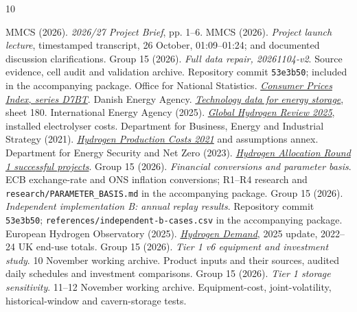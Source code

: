 \begin{thebibliography}{10}
\small\setlength{\itemsep}{3pt}\setlength{\parskip}{0pt}
 MMCS (2026). \emph{2026/27 Project Brief}, pp. 1--6.
 MMCS (2026). \emph{Project launch lecture}, timestamped
transcript, 26 October, 01:09--01:24; and documented discussion clarifications.
 Group 15 (2026). \emph{Full data repair, 20261104-v2}.
Source evidence, cell audit and validation archive. Repository commit
\texttt{53e3b50}; included in the accompanying package.
 Office for National Statistics.
\href{https://www.ons.gov.uk/economy/inflationandpriceindices/timeseries/d7bt/mm23}
{\emph{Consumer Prices Index, series D7BT}}.
 Danish Energy Agency.
\href{https://ens.dk/media/6589/download}{\emph{Technology data for energy storage}},
sheet 180.
 International Energy Agency (2025).
\href{https://www.iea.org/reports/global-hydrogen-review-2025/executive-summary}
{\emph{Global Hydrogen Review 2025}}, installed electrolyser costs.
 Department for Business, Energy and Industrial Strategy (2021).
\href{https://assets.publishing.service.gov.uk/media/611b710e8fa8f53dc994e59d/Hydrogen_Production_Costs_2021.pdf}
{\emph{Hydrogen Production Costs 2021}} and assumptions annex.
 Department for Energy Security and Net Zero (2023).
\href{https://www.gov.uk/government/publications/hydrogen-production-business-model-net-zero-hydrogen-fund-shortlisted-projects/hydrogen-production-business-model-net-zero-hydrogen-fund-har1-successful-projects}
{\emph{Hydrogen Allocation Round 1 successful projects}}.
 Group 15 (2026). \emph{Financial conversions and parameter basis}.
ECB exchange-rate and ONS inflation conversions; R1--R4 research and
\texttt{research/PARAMETER\_BASIS.md} in the accompanying package.
 Group 15 (2026). \emph{Independent implementation B: annual
replay results}. Repository commit \texttt{53e3b50};
\texttt{references/independent-b-cases.csv} in the accompanying package.
 European Hydrogen Observatory (2025).
\href{https://observatory.clean-hydrogen.europa.eu/hydrogen-landscape/end-use/hydrogen-demand}
{\emph{Hydrogen Demand}}, 2025 update, 2022--24 UK end-use totals.
 Group 15 (2026). \emph{Tier 1 v6 equipment and investment study}.
10 November working archive. Product inputs and their sources, audited
daily schedules and investment comparisons.
 Group 15 (2026). \emph{Tier 1 storage sensitivity}.
11--12 November working archive. Equipment-cost, joint-volatility,
historical-window and cavern-storage tests.
\end{thebibliography}
